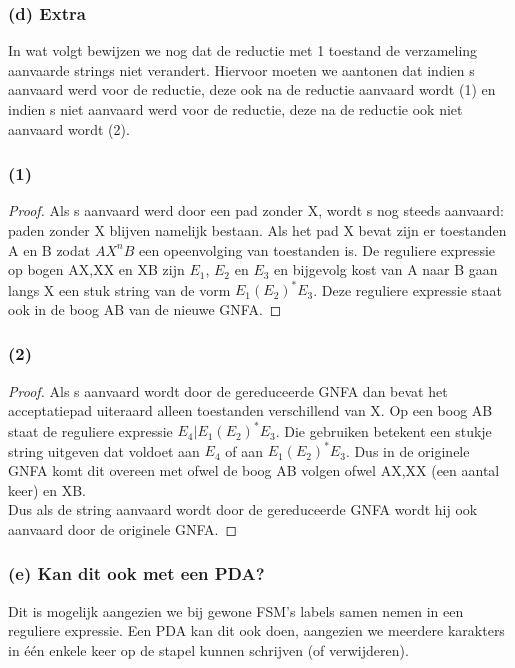 \subsubsection*{(d) Extra}
In wat volgt bewijzen we nog dat de reductie met 1 toestand de verzameling aanvaarde strings niet verandert. Hiervoor moeten we aantonen dat indien s aanvaard werd voor de reductie, deze ook na de reductie aanvaard wordt (1) en indien s niet aanvaard werd voor de reductie, deze na de reductie ook niet aanvaard wordt (2).\\
\subsubsection*{(1)}
\begin{proof}
Als s aanvaard werd door een pad zonder X, wordt s nog steeds aanvaard: paden zonder X blijven namelijk bestaan. Als het pad X bevat zijn er toestanden A en B zodat $AX^n B$ een opeenvolging van toestanden is. De reguliere expressie op bogen AX,XX en XB zijn $E_1$, $E_2$ en $E_3$ en bijgevolg kost van A naar B gaan langs X een stuk string van de vorm $E_1  (E_2)^* E_3$. Deze reguliere expressie staat ook in de boog AB van de nieuwe GNFA.
\end{proof}
\subsubsection*{(2)}
\begin{proof}
Als s aanvaard wordt door de gereduceerde GNFA dan bevat het acceptatiepad uiteraard alleen toestanden verschillend van X. Op een boog AB staat de reguliere expressie $E_4 | E_1 (E_2)^* E_3$. Die gebruiken betekent  een stukje string uitgeven dat voldoet aan $E_4$ of aan $E_1 (E_2)^* E_3$. Dus in de originele GNFA komt dit overeen met ofwel de boog AB volgen ofwel AX,XX (een aantal keer) en XB.\\
Dus als de string aanvaard wordt door de gereduceerde GNFA wordt hij ook aanvaard door de originele GNFA.
\end{proof}

\subsubsection*{(e) Kan dit ook met een PDA?}
Dit is mogelijk aangezien we bij gewone FSM's labels samen nemen in een reguliere expressie. Een PDA kan dit ook doen, aangezien we meerdere karakters in \'e\'en enkele keer op de stapel kunnen schrijven (of verwijderen).
